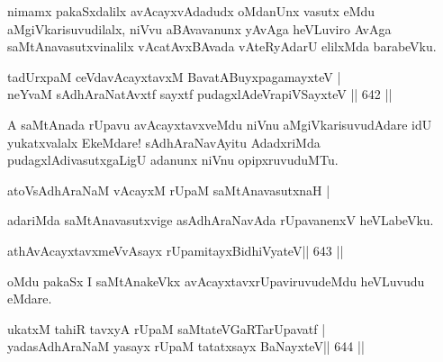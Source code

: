 \begin{artha}
nimamx pakaSxdalilx avAcayxvAdadudx oMdanUnx vasutx eMdu aMgiVkarisuvudilalx, niVvu aBAvavanunx yAvAga heVLuviro AvAga saMtAnavasutxvinalilx vAcatAvxBAvada vAteRyAdarU elilxMda barabeVku.
\end{artha}


\begin{shl}
tadUrxpaM ceVdavAcayxtavxM BavatA\s BuyxpagamayxteV | \\
neYvaM sAdhAraNatAvxtf sayxtf \footnotemark[1]pudagxlAdeVrapiVSayxteV \hfill||  642 ||  
\end{shl}

\begin{artha}
A saMtAnada rUpavu avAcayxtavxveMdu niVnu aMgiVkarisuvudAdare idU yukatxvalalx EkeMdare! sAdhAraNavAyitu AdadxriMda pudagxlAdivasutxgaLigU adanunx niVnu opipxruvuduMTu.\\
\begin{shl}
\footnotemark[1]atoV\s sAdhAraNaM vAcayxM rUpaM saMtAnavasutxnaH | \\
\end{shl}
adariMda saMtAnavasutxvige asAdhAraNavAda rUpavanenxV heVLabeVku.
\end{artha}


\begin{shl}
athAvAcayxtavx\footnotemark[2]meVvAsayx rUpamitayxBidhiVyateV\hfill ||  643 ||  
\end{shl}
\begin{artha}
oMdu pakaSx I saMtAnakeVkx avAcayxtavxrUpaviruvudeMdu heVLuvudu eMdare.
\end{artha}

\begin{shl}
ukatxM tahiR tavxyA rUpaM saMtateVGaRTarUpavatf | \\
yadasAdhAraNaM yasayx rUpaM tatatxsayx BaNayxteV\hfill ||  644 ||  
\end{shl}

